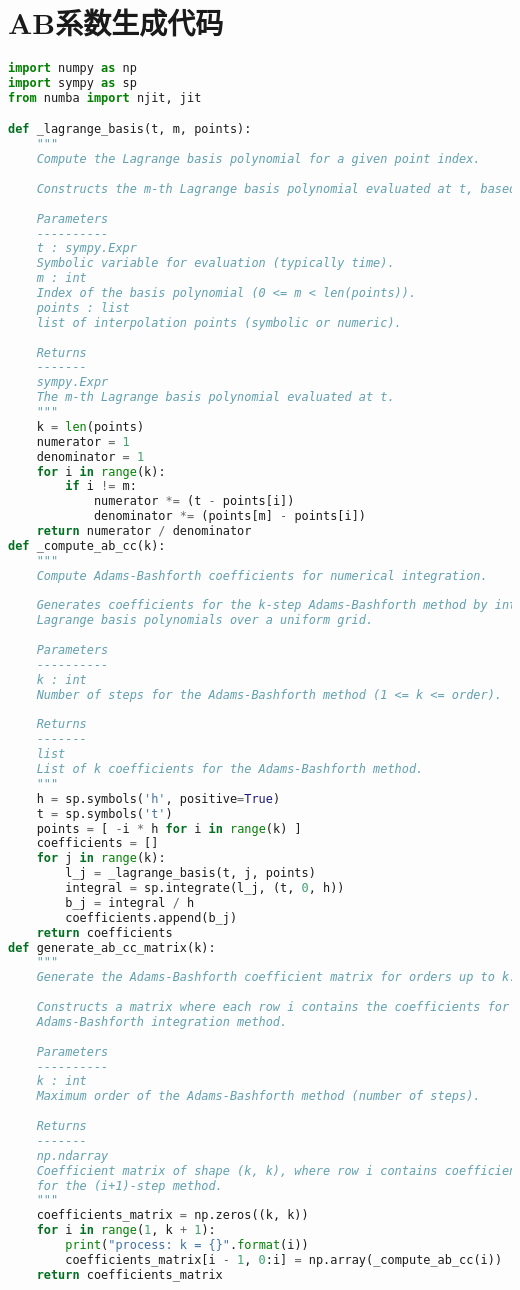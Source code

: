 \section{AB系数生成代码}\label{app:ab_code}
\begin{lstlisting}[language=Python, caption={AB系数生成代码}, label={code:ab_generation}]
import numpy as np
import sympy as sp
from numba import njit, jit

def _lagrange_basis(t, m, points):
    """
	Compute the Lagrange basis polynomial for a given point index.
	
	Constructs the m-th Lagrange basis polynomial evaluated at t, based on a set of interpolation points.
	
	Parameters
	----------
	t : sympy.Expr
	Symbolic variable for evaluation (typically time).
	m : int
	Index of the basis polynomial (0 <= m < len(points)).
	points : list
	list of interpolation points (symbolic or numeric).
	
	Returns
	-------
	sympy.Expr
	The m-th Lagrange basis polynomial evaluated at t.
	"""
	k = len(points)
	numerator = 1
	denominator = 1
	for i in range(k):
		if i != m:
			numerator *= (t - points[i])
			denominator *= (points[m] - points[i])
	return numerator / denominator
def _compute_ab_cc(k):
	"""
	Compute Adams-Bashforth coefficients for numerical integration.
	
	Generates coefficients for the k-step Adams-Bashforth method by integrating
	Lagrange basis polynomials over a uniform grid.
	
	Parameters
	----------
	k : int
	Number of steps for the Adams-Bashforth method (1 <= k <= order).
	
	Returns
	-------
	list
	List of k coefficients for the Adams-Bashforth method.
	"""
	h = sp.symbols('h', positive=True)
	t = sp.symbols('t')
	points = [ -i * h for i in range(k) ]
	coefficients = []
	for j in range(k):
		l_j = _lagrange_basis(t, j, points)
		integral = sp.integrate(l_j, (t, 0, h))
		b_j = integral / h
		coefficients.append(b_j)
	return coefficients
def generate_ab_cc_matrix(k):
	"""
	Generate the Adams-Bashforth coefficient matrix for orders up to k.
	
	Constructs a matrix where each row i contains the coefficients for the (i+1)-step
	Adams-Bashforth integration method.
	
	Parameters
	----------
	k : int
	Maximum order of the Adams-Bashforth method (number of steps).
	
	Returns
	-------
	np.ndarray
	Coefficient matrix of shape (k, k), where row i contains coefficients
	for the (i+1)-step method.
	"""
	coefficients_matrix = np.zeros((k, k))
	for i in range(1, k + 1):
		print("process: k = {}".format(i))
		coefficients_matrix[i - 1, 0:i] = np.array(_compute_ab_cc(i))
	return coefficients_matrix
\end{lstlisting}


